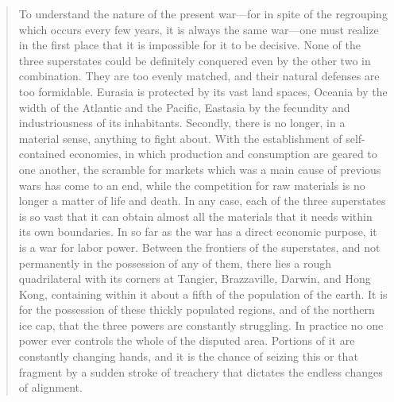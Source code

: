 \begin{quotation}
To understand the nature of the present war---for in spite of the
regrouping which occurs every few years, it is always the same war---one
must realize in the first place that it is impossible for it to be
decisive. None of the three superstates could be definitely conquered
even by the other two in combination. They are too evenly matched, and
their natural defenses are too formidable. Eurasia is protected by its
vast land spaces, Oceania by the width of the Atlantic and the Pacific,
Eastasia by the fecundity and industriousness of its inhabitants.
Secondly, there is no longer, in a material sense, anything to fight
about. With the establishment of self-contained economies, in which
production and consumption are geared to one another, the scramble for
markets which was a main cause of previous wars has come to an end,
while the competition for raw materials is no longer a matter of life
and death. In any case, each of the three superstates is so vast that it
can obtain almost all the materials that it needs within its own
boundaries. In so far as the war has a direct economic purpose, it is a
war for labor power. Between the frontiers of the superstates, and not
permanently in the possession of any of them, there lies a rough
quadrilateral with its corners at Tangier, Brazzaville, Darwin, and Hong
Kong, containing within it about a fifth of the population of the earth.
It is for the possession of these thickly populated regions, and of the
northern ice cap, that the three powers are constantly struggling. In
practice no one power ever controls the whole of the disputed area.
Portions of it are constantly changing hands, and it is the chance of
seizing this or that fragment by a sudden stroke of treachery that
dictates the endless changes of alignment.


\end{quotation}
